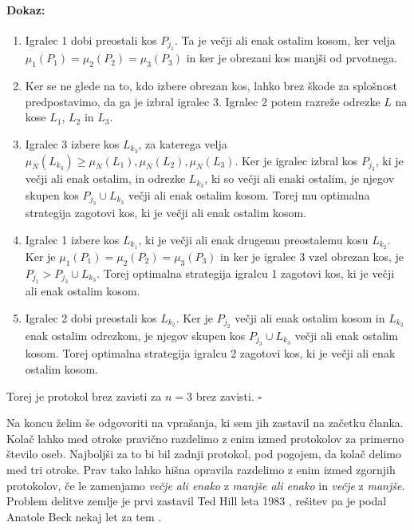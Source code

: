 \documentclass[a4paper, 12pt]{article}
\newenvironment{dokaz}{\paragraph{Dokaz:}}{\hfill$\square$\\}
\begin{document}
\begin{dokaz}
\begin{enumerate}
			\item \qquad Igralec 1 dobi preostali kos $P_{j_1}$. Ta je večji ali enak ostalim kosom, ker velja $\mu_1 (P_1) = \mu_2 (P_2) = \mu_3 (P_3)$ in ker je obrezani kos manjši od prvotnega.
			
			\item \qquad Ker se ne glede na to, kdo izbere obrezan kos, lahko brez škode za splošnost predpostavimo, da ga je izbral igralec 3. Igralec 2 potem razreže odrezke $L$ na kose $L_1$, $L_2$ in $L_3$.
			
			\item \qquad Igralec 3 izbere kos $L_{k_3}$, za katerega velja $\mu_N (L_{k_3}) \geq \mu_N (L_1), \mu_N (L_2), \mu_N (L_3)$. Ker je igralec izbral kos $P_{j_3}$, ki je večji ali enak ostalim, in odrezke $L_{k_3}$, ki so večji ali enaki ostalim, je njegov skupen kos $P_{j_3} \cup L_{k_3}$ večji ali enak ostalim kosom. Torej mu optimalna strategija zagotovi kos, ki je večji ali enak ostalim kosom.
			
			\item \qquad Igralec 1 izbere kos $L_{k_1}$, ki je večji ali enak drugemu preostalemu kosu $L_{k_2}$. Ker je $\mu_1 (P_1) = \mu_2 (P_2) = \mu_3 (P_3)$ in ker je igralec 3 vzel obrezan kos, je $P_{j_1} > P_{j_3} \cup L_{k_3}$. Torej optimalna strategija igralcu 1 zagotovi kos, ki je večji ali enak ostalim kosom.
			
			\item \qquad Igralec 2 dobi preostali kos $L_{k_2}$. Ker je $P_{j_2}$ večji ali enak ostalim kosom in $L_{k_2}$ enak ostalim odrezkom, je njegov skupen kos $P_{j_3} \cup L_{k_3}$ večji ali enak ostalim kosom. Torej optimalna strategija igralcu 2 zagotovi kos, ki je večji ali enak ostalim kosom.
			
		\end{enumerate}
		Torej je protokol brez zavisti za $n = 3$ brez zavisti.
	\end{dokaz}

	Na koncu želim še odgovoriti na vprašanja, ki sem jih zastavil na začetku članka. Kolač lahko med otroke pravično razdelimo z enim izmed protokolov za primerno število oseb. Najboljši za to bi bil zadnji protokol, pod pogojem, da kolač delimo med tri otroke. Prav tako lahko hišna opravila razdelimo z enim izmed zgornjih protokolov, če le zamenjamo \textit{večje ali enako} z \textit{manjše ali enako} in \textit{večje} z \textit{manjše}. Problem delitve zemlje je prvi zastavil Ted Hill leta 1983 \cite{hill}, rešitev pa je podal Anatole Beck \cite{beck} nekaj let za tem .
	
\end{document}
